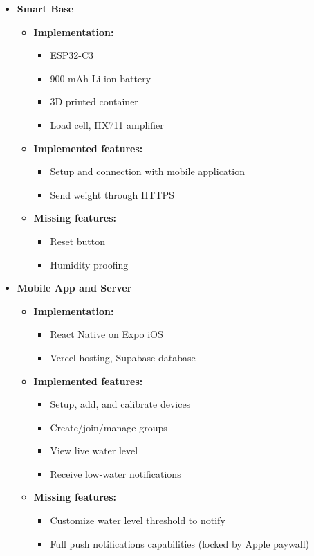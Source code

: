 \begin{itemize}

\item \textbf{Smart Base}

\begin{itemize}
    \item \textbf{Implementation:}
    \begin{itemize}
        \item ESP32-C3
        \item 900 mAh Li-ion battery
        \item 3D printed container
        \item Load cell, HX711 amplifier
    \end{itemize}

    \item \textbf{Implemented features:}
    \begin{itemize}
        \item Setup and connection with mobile application
        \item Send weight through HTTPS
    \end{itemize}

    \item \textbf{Missing features:}
    \begin{itemize}
        \item Reset button
        \item Humidity proofing
    \end{itemize}
\end{itemize}

\item \textbf{Mobile App and Server}

\begin{itemize}
    \item \textbf{Implementation:}
    \begin{itemize}
        \item React Native on Expo iOS
        \item Vercel hosting, Supabase database
    \end{itemize}

    \item \textbf{Implemented features:}
    \begin{itemize}
        \item Setup, add, and calibrate devices
        \item Create/join/manage groups
        \item View live water level
        \item Receive low-water notifications
    \end{itemize}

    \item \textbf{Missing features:}
    \begin{itemize}
        \item Customize water level threshold to notify
        \item Full push notifications capabilities (locked by Apple paywall)
    \end{itemize}
\end{itemize}

\end{itemize}